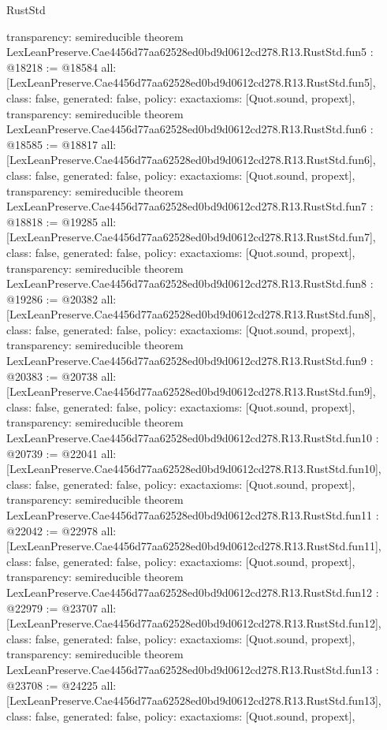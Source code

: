 \begin{lexlean}{RustStd}
\begin{coremodule}
{  transparency: semireducible
}
theorem LexLeanPreserve.Cae4456d77aa62528ed0bd9d0612cd278.R13.RustStd.fun5 : @18218 := @18584 {
  all: [LexLeanPreserve.Cae4456d77aa62528ed0bd9d0612cd278.R13.RustStd.fun5],
  class: false,
  generated: false,
  policy: exact{axioms: [Quot.sound, propext]},
  transparency: semireducible
}
theorem LexLeanPreserve.Cae4456d77aa62528ed0bd9d0612cd278.R13.RustStd.fun6 : @18585 := @18817 {
  all: [LexLeanPreserve.Cae4456d77aa62528ed0bd9d0612cd278.R13.RustStd.fun6],
  class: false,
  generated: false,
  policy: exact{axioms: [Quot.sound, propext]},
  transparency: semireducible
}
theorem LexLeanPreserve.Cae4456d77aa62528ed0bd9d0612cd278.R13.RustStd.fun7 : @18818 := @19285 {
  all: [LexLeanPreserve.Cae4456d77aa62528ed0bd9d0612cd278.R13.RustStd.fun7],
  class: false,
  generated: false,
  policy: exact{axioms: [Quot.sound, propext]},
  transparency: semireducible
}
theorem LexLeanPreserve.Cae4456d77aa62528ed0bd9d0612cd278.R13.RustStd.fun8 : @19286 := @20382 {
  all: [LexLeanPreserve.Cae4456d77aa62528ed0bd9d0612cd278.R13.RustStd.fun8],
  class: false,
  generated: false,
  policy: exact{axioms: [Quot.sound, propext]},
  transparency: semireducible
}
theorem LexLeanPreserve.Cae4456d77aa62528ed0bd9d0612cd278.R13.RustStd.fun9 : @20383 := @20738 {
  all: [LexLeanPreserve.Cae4456d77aa62528ed0bd9d0612cd278.R13.RustStd.fun9],
  class: false,
  generated: false,
  policy: exact{axioms: [Quot.sound, propext]},
  transparency: semireducible
}
theorem LexLeanPreserve.Cae4456d77aa62528ed0bd9d0612cd278.R13.RustStd.fun10 : @20739 := @22041 {
  all: [LexLeanPreserve.Cae4456d77aa62528ed0bd9d0612cd278.R13.RustStd.fun10],
  class: false,
  generated: false,
  policy: exact{axioms: [Quot.sound, propext]},
  transparency: semireducible
}
theorem LexLeanPreserve.Cae4456d77aa62528ed0bd9d0612cd278.R13.RustStd.fun11 : @22042 := @22978 {
  all: [LexLeanPreserve.Cae4456d77aa62528ed0bd9d0612cd278.R13.RustStd.fun11],
  class: false,
  generated: false,
  policy: exact{axioms: [Quot.sound, propext]},
  transparency: semireducible
}
theorem LexLeanPreserve.Cae4456d77aa62528ed0bd9d0612cd278.R13.RustStd.fun12 : @22979 := @23707 {
  all: [LexLeanPreserve.Cae4456d77aa62528ed0bd9d0612cd278.R13.RustStd.fun12],
  class: false,
  generated: false,
  policy: exact{axioms: [Quot.sound, propext]},
  transparency: semireducible
}
theorem LexLeanPreserve.Cae4456d77aa62528ed0bd9d0612cd278.R13.RustStd.fun13 : @23708 := @24225 {
  all: [LexLeanPreserve.Cae4456d77aa62528ed0bd9d0612cd278.R13.RustStd.fun13],
  class: false,
  generated: false,
  policy: exact{axioms: [Quot.sound, propext]},
}
\end{coremodule}
\end{lexlean}

